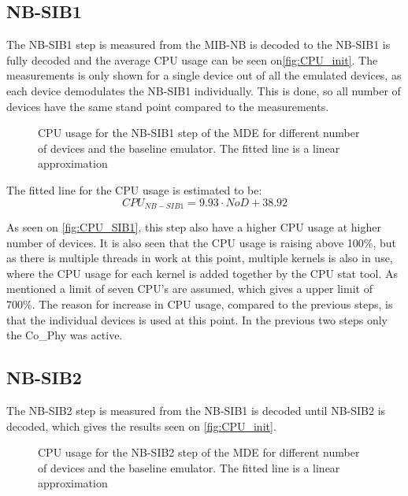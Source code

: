 \subsection{NB-SIB1}
The NB-SIB1 step is measured from the MIB-NB is decoded to the NB-SIB1 is fully decoded and the average CPU usage can be seen on\autoref{fig:CPU_init}. The measurements is only shown for a single device out of all the emulated devices, as each device demodulates the NB-SIB1 individually. This is done, so all number of devices have the same stand point compared to the measurements.


\begin{figure}[H]
\centering
\resizebox{0.5\textwidth}{!}{
}
\caption{CPU usage for the NB-SIB1 step of the MDE for different number of devices and the baseline emulator. The fitted line is a linear approximation}
\label{fig:CPU_SIB1}
\end{figure}

The fitted line for the CPU usage is estimated to be:
\begin{equation}
CPU_{NB-SIB1} = 9.93 \cdot NoD + 38.92
\end{equation}

As seen on \autoref{fig:CPU_SIB1}, this step also have a higher CPU usage at higher number of devices. It is also seen that the CPU usage is raising above 100\%, but as there is multiple threads in work at this point, multiple kernels is also in use, where the CPU usage for each kernel is added together by the CPU stat tool. As mentioned a limit of seven CPU's are assumed, which gives a upper limit of 700\%. The reason for increase in CPU usage, compared to the previous steps, is that the individual devices is used at this point. In the previous two steps only the Co\_Phy was active.

\subsection{NB-SIB2}
The NB-SIB2 step is measured from the NB-SIB1 is decoded until NB-SIB2 is decoded, which gives the results seen on \autoref{fig:CPU_init}. 

\begin{figure}[H]
\centering
\resizebox{0.5\textwidth}{!}{
}
\caption{CPU usage for the NB-SIB2 step of the MDE for different number of devices and the baseline emulator. The fitted line is a linear approximation}
\label{fig:CPU_SIB2}
\end{figure}

